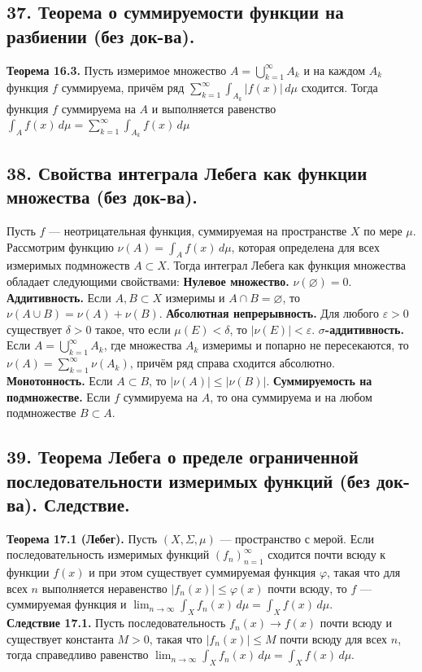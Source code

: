 \documentclass[12pt]{article}
\begin{document}
\subsection*{37. Теорема о суммируемости функции на разбиении (без док-ва).}
\textbf{Теорема 16.3.} Пусть измеримое множество $A = \bigcup_{k=1}^\infty A_k$ и на каждом $A_k$ функция $f$ суммируема, причём ряд $\sum_{k=1}^\infty \int_{A_k} |f(x)|\,d\mu$ сходится. Тогда функция $f$ суммируема на $A$ и выполняется равенство $\int_A f(x)\,d\mu = \sum_{k=1}^\infty \int_{A_k} f(x)\,d\mu$

\subsection*{38. Свойства интеграла Лебега как функции множества (без док-ва).}
Пусть $f$ — неотрицательная функция, суммируемая на пространстве $X$ по мере $\mu$. Рассмотрим функцию $\nu(A) = \int_A f(x)\,d\mu$, которая определена для всех измеримых подмножеств $A \subset X$. Тогда интеграл Лебега как функция множества обладает следующими свойствами: \textbf{Нулевое множество.} $\nu(\varnothing) = 0$. \textbf{Аддитивность.} Если $A,B \subset X$ измеримы и $A \cap B = \varnothing$, то $\nu(A \cup B) = \nu(A) + \nu(B)$. \textbf{Абсолютная непрерывность.} Для любого $\varepsilon > 0$ существует $\delta > 0$ такое, что если $\mu(E) < \delta$, то $|\nu(E)| < \varepsilon$. \textbf{$\sigma$-аддитивность.} Если $A = \bigcup_{k=1}^\infty A_k$, где множества $A_k$ измеримы и попарно не пересекаются, то $\nu(A) = \sum_{k=1}^\infty \nu(A_k)$, причём ряд справа сходится абсолютно. \textbf{Монотонность.} Если $A \subset B$, то $|\nu(A)| \leq |\nu(B)|$. \textbf{Суммируемость на подмножестве.} Если $f$ суммируема на $A$, то она суммируема и на любом подмножестве $B \subset A$.

\subsection*{39. Теорема Лебега о пределе ограниченной последовательности измеримых функций
(без док-ва). Следствие.}
\textbf{Теорема 17.1 (Лебег).} Пусть $(X,\Sigma,\mu)$ — пространство с мерой. Если последовательность измеримых функций $(f_n)_{n=1}^\infty$ сходится почти всюду к функции $f(x)$ и при этом существует суммируемая функция $\varphi$, такая что для всех $n$ выполняется неравенство $|f_n(x)| \leq \varphi(x)$ почти всюду, то $f$ — суммируемая функция и $\lim_{n \to \infty} \int_X f_n(x)\,d\mu = \int_X f(x)\,d\mu$. \\\textbf{Следствие 17.1.} Пусть последовательность $f_n(x) \to f(x)$ почти всюду и существует константа $M > 0$, такая что $|f_n(x)| \leq M$ почти всюду для всех $n$, тогда справедливо равенство $\lim_{n \to \infty} \int_X f_n(x)\,d\mu = \int_X f(x)\,d\mu$.
\end{document}

